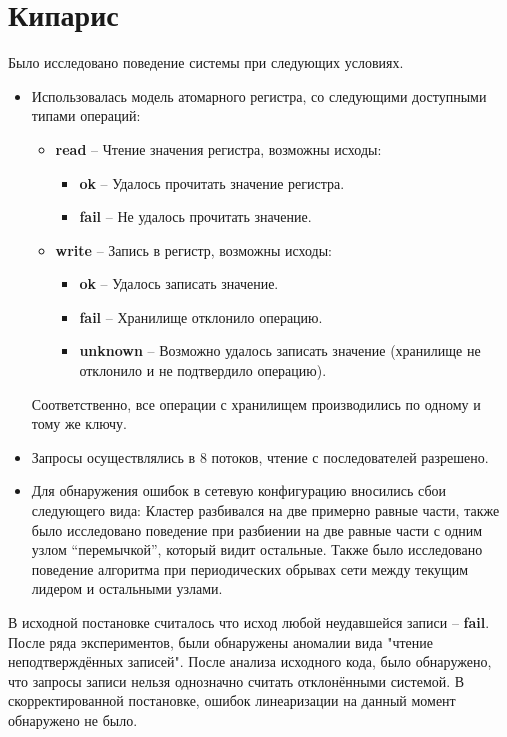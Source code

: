 \documentclass[pdftex,ptm,14pt,a4paper]{extreport}
\theoremstyle{definition}
\begin{document}
\section{Кипарис}
Было исследовано поведение системы при следующих условиях.
\begin{itemize}
    \item Использовалась модель атомарного регистра, со следующими доступными типами операций:
        \begin{itemize}
            \item \textbf{read} -- Чтение значения регистра, возможны исходы:
                \begin{itemize}
                    \item \textbf{ok} -- Удалось прочитать значение регистра.
                    \item \textbf{fail} -- Не удалось прочитать значение.
                \end{itemize}
            \item \textbf{write} -- Запись в регистр, возможны исходы:
                \begin{itemize}
                    \item \textbf{ok} -- Удалось записать значение.
                    \item \textbf{fail} --  Хранилище отклонило операцию.
                    \item \textbf{unknown} -- Возможно удалось записать значение
                        (хранилище не отклонило и не подтвердило операцию).
                \end{itemize}
        \end{itemize}
        Соответственно, все операции с хранилищем производились по одному и тому же ключу.
    \item Запросы осуществлялись в 8 потоков, чтение с последователей разрешено.
    \item Для обнаружения ошибок в сетевую конфигурацию вносились сбои следующего вида:
    \subitem Кластер разбивался на две примерно равные части, также было исследовано поведение при разбиении
            на две равные части с одним узлом “перемычкой”, который видит остальные.
    \subitem Также было исследовано поведение алгоритма при периодических обрывах сети между текущим лидером
            и остальными узлами.
\end{itemize}
В исходной постановке считалось что исход любой неудавшейся записи -- \textbf{fail}.
После ряда экспериментов, были обнаружены аномалии вида "чтение неподтверждённых записей".
После анализа исходного кода, было обнаружено, что запросы записи нельзя однозначно считать отклонёнными системой.
В скорректированной постановке, ошибок линеаризации на данный момент обнаружено не было.
\end{document}
